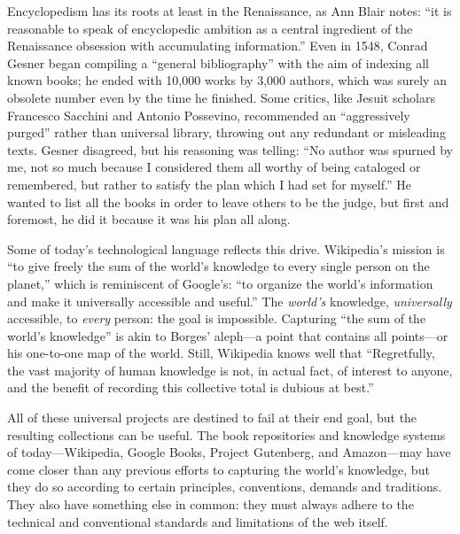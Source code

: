 Encyclopedism has its roots at least in the Renaissance, as Ann Blair notes: ``it is reasonable to speak of encyclopedic ambition as a central ingredient of the Renaissance obsession with accumulating information.''\autocite[``Information Management in Comparative Perspective'']{blair_too_2010} Even in 1548, Conrad Gesner began compiling a ``general bibliography'' with the aim of indexing all known books; he ended with 10,000 works by 3,000 authors, which was surely an obsolete number even by the time he finished.\autocite[93]{burke_social_2000} Some critics, like Jesuit scholars Francesco Sacchini and Antonio Possevino, recommended an ``aggressively purged'' rather than universal library, throwing out any redundant or misleading texts. Gesner disagreed, but his reasoning was telling: ``No author was spurned by me, not so much because I considered them all worthy of being cataloged or remembered, but rather to satisfy the plan which I had set for myself.''\autocite[``Bibliographies'']{blair_too_2010} He wanted to list all the books in order to leave others to be the judge, but first and foremost, he did it because it was his plan all along.

Some of today's technological language reflects this drive. Wikipedia's mission is ``to give freely the sum of the world's knowledge to every single person on the planet,''\autocite[18]{reagle_good_2010} which is reminiscent of Google's: ``to organize the world's information and make it universally accessible and useful.''\autocite{_company_????} The \emph{world's} knowledge, \emph{universally} accessible, to \emph{every} person: the goal is impossible. Capturing ``the sum of the world's knowledge'' is akin to Borges' aleph---a point that contains all points---or his one-to-one map of the world. Still, Wikipedia knows well that ``Regretfully, the vast majority of human knowledge is not, in actual fact, of interest to anyone, and the benefit of recording this collective total is dubious at best.''\autocite[17]{reagle_good_2010}

All of these universal projects are destined to fail at their end goal, but the resulting collections can be useful. The book repositories and knowledge systems of today---Wikipedia, Google Books, Project Gutenberg, and Amazon---may have come closer than any previous efforts to capturing the world's knowledge, but they do so according to certain principles, conventions, demands and traditions. They also have something else in common: they must always adhere to the technical and conventional standards and limitations of the web itself. 

